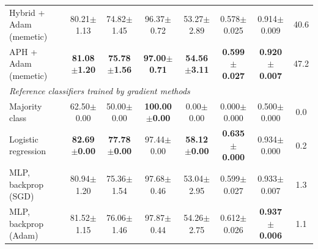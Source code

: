 \begin{table}[!t]
{\begin{tabular}{lccccccc}
Hybrid + Adam (memetic) & 80.21$\pm$1.13 & 74.82$\pm$1.45 & 96.37$\pm$0.72 & 53.27$\pm$2.89 & 0.578$\pm$0.025 & 0.914$\pm$0.009 & 40.6 \\
APH + Adam (memetic) & \textbf{81.08$\pm$1.20} & \textbf{75.78$\pm$1.56} & \textbf{97.00$\pm$0.71} & \textbf{54.56$\pm$3.11} & \textbf{0.599$\pm$0.027} & \textbf{0.920$\pm$0.007} & 47.2 \\
\midrule
\multicolumn{8}{l}{\textit{Reference classifiers trained by gradient methods}} \\
Majority class & 62.50$\pm$0.00 & 50.00$\pm$0.00 & \textbf{100.00$\pm$0.00} & 0.00$\pm$0.00 & 0.000$\pm$0.000 & 0.500$\pm$0.000 & 0.0 \\
Logistic regression & \textbf{82.69$\pm$0.00} & \textbf{77.78$\pm$0.00} & 97.44$\pm$0.00 & \textbf{58.12$\pm$0.00} & \textbf{0.635$\pm$0.000} & 0.934$\pm$0.000 & 0.2 \\
MLP, backprop (SGD) & 80.94$\pm$1.20 & 75.36$\pm$1.54 & 97.68$\pm$0.46 & 53.04$\pm$2.95 & 0.599$\pm$0.027 & 0.933$\pm$0.007 & 1.3 \\
MLP, backprop (Adam) & 81.52$\pm$1.15 & 76.06$\pm$1.46 & 97.87$\pm$0.44 & 54.26$\pm$2.75 & 0.612$\pm$0.026 & \textbf{0.937$\pm$0.006} & 1.1 \\
\bottomrule
\end{tabular}}
\end{table}
